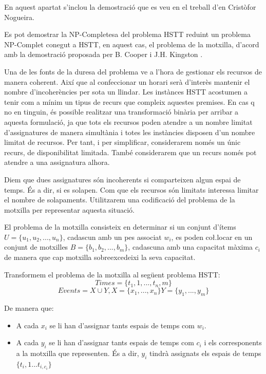 \documentclass[11pt,a4paper,twoside]{report}
\begin{document}
    En aquest apartat s'inclou la demostració que es veu en el treball d'en Cristòfor Nogueira\cite{treballCristo}.
    
    Es pot demostrar la NP-Completesa del problema HSTT reduint un problema NP-Complet conegut a HSTT, en aquest cas, el problema de la motxilla\cite{wiki:bin}, d'acord amb la demostració proposada per B. Cooper i J.H. Kingston \cite{complexityHSTT}.

    Una de les fonts de la duresa del problema ve a l'hora de gestionar els recursos de manera coherent. Així que al confeccionar un horari serà d'interès mantenir el nombre d'incoherències per sota un llindar. 
    Les instànces HSTT acostumen a tenir com a mínim un tipus de recurs que compleix aquestes premises. 
    En cas q no en tinguin, és possible realitzar una transformació binària per arribar a aquesta formulació, 
    ja que tots els recursos poden atendre a un nombre limitat d'assignatures de manera simultània i totes les instàncies disposen d'un nombre limitat de recursos. Per tant, i per simplificar, considerarem només un únic recurs, de disponibilitat limitada. També considerarem que un recurs només pot atendre a una assignatura alhora.

    Diem que dues assignatures són incoherents si comparteixen algun espai de temps. És a dir, si es solapen. Com que els recursos són limitats interessa limitar el nombre de solapaments. Utilitzarem una codificació del problema de la motxilla per representar aquesta situació.

    El problema de la motxilla consisteix en determinar si un conjunt d'ítems $U = \{u_1, u_2, ..., u_n\}$, cadascun amb un pes associat $w_i$, es poden co\l.locar en un conjunt de motxilles $B = \{b_1, b_2, ..., b_m\}$, 
    cadascuna amb una capacitat màxima $c_i$ de manera que cap motxilla sobreexcedeixi la seva capacitat.

    Transformem el problema de la motxilla al següent problema HSTT: 
    \[
        Times = \{t_1,1, ..., t_n,m\}
    \]\[
        Events = X \cup Y, X = \{x_1, ..., x_n\} Y = \{y_1, ..., y_m\}
    \]

    De manera que: 
    \begin{itemize}
      \item A cada $x_i$ se li han d'assignar tants espais de temps com $w_i$.
      \item A cada $y_i$ se li han d'assignar tants espais de temps com $c_i$ i els corresponents a la motxilla que representen. És a dir, $y_i$ tindrà assignats els espais de temps $\{t_i,1 ... t_{i,c_i}\}$
    \end{itemize}
    
\end{document}

